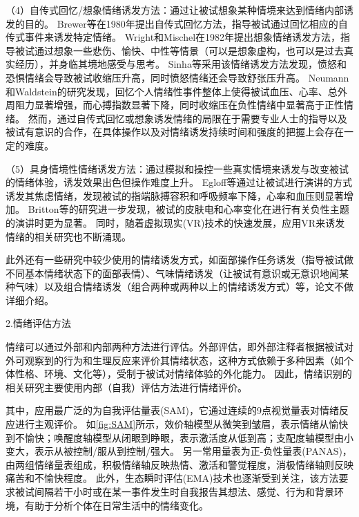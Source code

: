 （4）自传式回忆/想象情绪诱发方法：通过让被试想象某种情境来达到情绪内部诱发的目的。
Brewer等\cite{Brewer1980}在1980年提出自传式回忆方法，指导被试通过回忆相应的自传式事件来诱发特定情绪。
Wright和Mischel\cite{Wright1982}在1982年提出想象情绪诱发方法，指导被试通过想象一些悲伤、愉快、中性等情景（可以是想象虚构，也可以是过去真实经历），并身临其境地感受与思考。
Sinha等\cite{Sinha1992}采用该情绪诱发方法发现，愤怒和恐惧情绪会导致被试收缩压升高，同时愤怒情绪还会导致舒张压升高。
Neumann和Waldstein\cite{Neumann2001}的研究发现，回忆个人情绪性事件整体上使得被试血压、心率、总外周阻力显著增强，而心搏指数显著下降，同时收缩压在负性情绪中显著高于正性情绪。
然而，通过自传式回忆或想象诱发情绪的局限在于需要专业人士的指导以及被试有意识的合作，在具体操作以及对情绪诱发持续时间和强度的把握上会存在一定的难度。


（5）具身情境性情绪诱发方法：通过模拟和操控一些真实情境来诱发与改变被试的情绪体验，诱发效果出色但操作难度上升。
Egloff等\cite{Egloff2002}通过让被试进行演讲的方式诱发其焦虑情绪，发现被试的指端脉搏容积和呼吸频率下降，心率和血压则显著增加。
Britton等\cite{Britton2006}的研究进一步发现，被试的皮肤电和心率变化在进行有关负性主题的演讲时更为显著。
同时，随着虚拟现实(VR)技术的快速发展，应用VR来诱发情绪的相关研究也不断涌现。

此外还有一些研究中较少使用的情绪诱发方式，如面部操作任务诱发（指导被试做不同基本情绪状态下的面部表情）、气味情绪诱发（让被试有意识或无意识地闻某种气味）以及组合情绪诱发（组合两种或两种以上的情绪诱发方式）等，论文不做详细介绍。

2.情绪评估方法

情绪可以通过外部和内部两种方法进行评估。外部评估，即外部注释者根据被试对外可观察到的行为和生理反应来评价其情绪状态，这种方式依赖于多种因素（如个体性格、环境、文化等），受制于被试对情绪体验的外化能力。
因此，情绪识别的相关研究主要使用内部（自我）评估方法进行情绪评价。

其中，应用最广泛的为自我评估量表(SAM)\cite{Bradley1994}，它通过连续的9点视觉量表对情绪反应进行主观评价。
如\autoref{fig:SAM}所示，效价轴模型从微笑到皱眉，表示情绪从愉快到不愉快；唤醒度轴模型从闭眼到睁眼，表示激活度从低到高；支配度轴模型由小变大，表示从被控制/服从到控制/强大。
另一常用量表为正-负性量表(PANAS)，由两组情绪量表组成，积极情绪轴反映热情、激活和警觉程度，消极情绪轴则反映痛苦和不愉快程度\cite{AMIGOS2017}。
此外，生态瞬时评估(EMA)技术也逐渐受到关注，该方法要求被试间隔若干小时或在某一事件发生时自我报告其想法、感觉、行为和背景环境，有助于分析个体在日常生活中的情绪变化。

